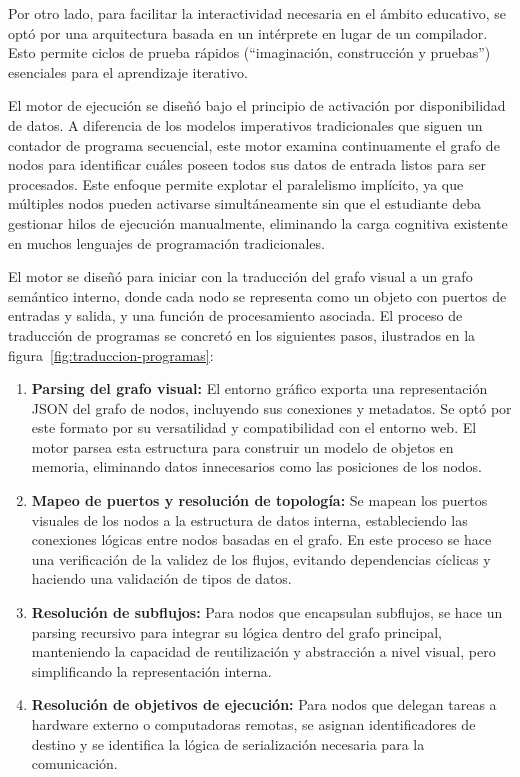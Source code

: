 Por otro lado, para facilitar la interactividad necesaria en el ámbito educativo, se optó por una arquitectura basada en un intérprete en lugar de un compilador. Esto permite ciclos de prueba rápidos (“imaginación, construcción y pruebas”) esenciales para el aprendizaje iterativo.

El motor de ejecución se diseñó bajo el principio de activación por disponibilidad de datos. A diferencia de los modelos imperativos tradicionales que siguen un contador de programa secuencial, este motor examina continuamente el grafo de nodos para identificar cuáles poseen todos sus datos de entrada listos para ser procesados. Este enfoque permite explotar el paralelismo implícito, ya que múltiples nodos pueden activarse simultáneamente sin que el estudiante deba gestionar hilos de ejecución manualmente, eliminando la carga cognitiva existente en muchos lenguajes de programación tradicionales.

El motor se diseñó para iniciar con la traducción del grafo visual a un grafo semántico interno, donde cada nodo se representa como un objeto con puertos de entradas y salida, y una función de procesamiento asociada. El proceso de traducción de programas se concretó en los siguientes pasos, ilustrados en la figura~\ref{fig:traduccion-programas}:

\begin{enumerate}
    \item \textbf{Parsing del grafo visual:} El entorno gráfico exporta una representación JSON del grafo de nodos, incluyendo sus conexiones y metadatos. Se optó por este formato por su versatilidad y compatibilidad con el entorno web. El motor parsea esta estructura para construir un modelo de objetos en memoria, eliminando datos innecesarios como las posiciones de los nodos.
    \item \textbf{Mapeo de puertos y resolución de topología:} Se mapean los puertos visuales de los nodos a la estructura de datos interna, estableciendo las conexiones lógicas entre nodos basadas en el grafo. En este proceso se hace una verificación de la validez de los flujos, evitando dependencias cíclicas y haciendo una validación de tipos de datos.
    \item \textbf{Resolución de subflujos:} Para nodos que encapsulan subflujos, se hace un parsing recursivo para integrar su lógica dentro del grafo principal, manteniendo la capacidad de reutilización y abstracción a nivel visual, pero simplificando la representación interna.
    \item \textbf{Resolución de objetivos de ejecución:} Para nodos que delegan tareas a hardware externo o computadoras remotas, se asignan identificadores de destino y se identifica la lógica de serialización necesaria para la comunicación.
\end{enumerate}

